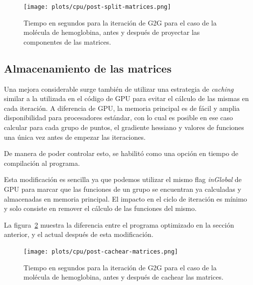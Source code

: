 \begin{figure}[htbp]
   \centering
   \texttt{[image: plots/cpu/post-split-matrices.png]}
   \caption{Tiempo en segundos para la iteraci\'on de G2G para el caso de la
   mol\'ecula de hemoglobina, antes y despu\'es de proyectar las componentes
   de las matrices.}
   \label{fig:lio-post-partir-mats}
\end{figure}

\subsection{Almacenamiento de las matrices}

Una mejora considerable surge tambi\'en de utilizar una estrategia de \textit{caching}
similar a la utilizada en el c\'odigo de GPU para evitar el c\'alculo de las mismas
en cada iteraci\'on. A diferencia de GPU, la memoria principal es de f\'acil y
amplia disponibilidad para procesadores est\'andar, con lo cual es posible en ese
caso calcular para cada grupo de puntos, el gradiente hessiano y valores de
funciones una \'unica vez antes de empezar las iteraciones.

De manera de poder controlar esto, se habilit\'o como una opci\'on en tiempo de
compilaci\'on al programa.

Esta modificaci\'on es sencilla ya que podemos utilizar el mismo flag
\textit{inGlobal} de GPU para marcar que las funciones de un grupo se encuentran
ya calculadas y almacenadas en memoria principal. El impacto en el ciclo de
iteraci\'on es m\'inimo y solo consiste en remover el c\'alculo de las funciones
del mismo.

La figura~\ref{fig:lio-post-cachear} muestra la diferencia entre el programa
optimizado en la secci\'on anterior, y el actual despu\'es de esta modificaci\'on.

\begin{figure}[htbp]
   \centering
   \texttt{[image: plots/cpu/post-cachear-matrices.png]}
   \caption{Tiempo en segundos para la iteraci\'on de G2G para el caso de la
   mol\'ecula de hemoglobina, antes y despu\'es de cachear las matrices.}
   \label{fig:lio-post-cachear}
\end{figure}



